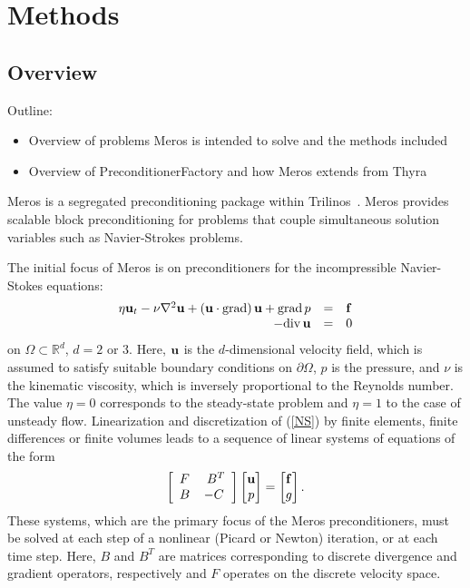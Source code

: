 \section{Methods}
\label{index_methods}
\subsection{Overview}
Outline:
\begin{itemize}
\item Overview of problems Meros is intended to solve and the methods
  included
\item Overview of PreconditionerFactory and how Meros extends from
  Thyra
\end{itemize}


Meros is a segregated preconditioning package within
Trilinos~\cite{Trilinos-Overview}.  Meros
provides scalable block preconditioning for problems that couple
simultaneous solution variables such as Navier-Strokes problems.

The initial focus of Meros is on preconditioners for the
incompressible Navier-Stokes equations:
\begin{equation} \label{NS}
  \begin{array}{rcl}
    \eta {\bf u}_t -\nu \nabla^2 {\bf u}
    + ({\bf u} \cdot {\rm grad})\, {\bf u} +
    {\rm grad}\, p &= &{\bf f} \\
    -{\rm div}\, {\bf u} &= &0
  \end{array}
\end{equation}
on $\Omega \subset \mathbb{R}^d$, $d=2$ or $3$.  Here, ${\bf u}$
is the $d$-dimensional velocity field, which is assumed to satisfy
suitable boundary conditions on $\partial \Omega$, $p$ is the
pressure, and $\nu$ is the kinematic viscosity, which is
inversely proportional to the Reynolds number.  
The value $\eta=0$ corresponds to the steady-state problem and $\eta=1$
to the  case of unsteady flow. 
Linearization and discretization of (\ref{NS}) by finite elements, finite 
differences or finite volumes leads to a sequence of linear systems of 
equations of the form
\begin{equation} \label{NSdiscretelinearStabilized}
\left[  
  \begin{array}{lc}
    F  & \ B^T   \\ B  & -C
  \end{array}
 \right]
  \begin{bmatrix}
    {\bf u}\\ p
  \end{bmatrix}
  =
  \begin{bmatrix}
    {\bf f}\\ g
  \end{bmatrix}.
\end{equation}
These systems, which are the primary focus of the Meros
preconditioners, must be solved 
at each step of a nonlinear (Picard or Newton) iteration, or at
each time step.   Here, $B$ and $B^T$ are matrices corresponding
to discrete divergence and gradient operators, respectively and
$F$ operates on the discrete velocity space. 

